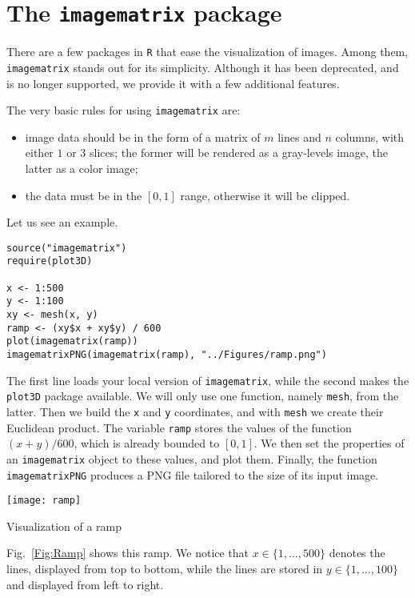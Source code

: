 \section{The \texttt{imagematrix} package}

There are a few packages in \verb|R| that ease the visualization of images.
Among them, \verb|imagematrix| stands out for its simplicity.
Although it has been deprecated, and is no longer supported, we provide it with a few additional features.

The very basic rules for using \verb|imagematrix| are:
\begin{itemize}
\item image data should be in the form of a matrix of $m$ lines and $n$ columns, with either $1$ or $3$ slices; the former will be rendered as a gray-levels image, the latter as a color image;
\item the data must be in the $[0,1]$ range, otherwise it will be clipped.
\end{itemize}

Let us see an example.
\lstset{numbers=left, numberstyle=\tiny, numberblanklines=false, numbersep=5pt}
\begin{lstlisting}[firstnumber=auto,frame=tb]
source("imagematrix")
require(plot3D)

x <- 1:500
y <- 1:100
xy <- mesh(x, y)
ramp <- (xy$x + xy$y) / 600
plot(imagematrix(ramp))
imagematrixPNG(imagematrix(ramp), "../Figures/ramp.png")
\end{lstlisting}

The first line loads your local version of \verb|imagematrix|, while the second makes the \verb|plot3D| package available.
We will only use one function, namely \verb|mesh|, from the latter.
Then we build the \verb|x| and \verb|y| coordinates, and with \verb|mesh| we create their Euclidean product.
The variable \verb|ramp| stores the values of the function $(x+y)/600$, which is already bounded to $[0,1]$.
We then set the properties of an \verb|imagematrix| object to these values, and plot them.
Finally, the function \verb|imagematrixPNG| produces a PNG file tailored to the size of its input image.

\begin{marginfigure}
\centering
\texttt{[image: ramp]}
\caption{Visualization of a ramp}\label{Fig:Ramp}
\end{marginfigure}

Fig.~\ref{Fig:Ramp} shows this ramp.
We notice that $x\in\{1,\dots,500\}$ denotes the lines, displayed from top to bottom,
while the lines are stored in $y\in\{1,\dots,100\}$ and displayed from left to right.

